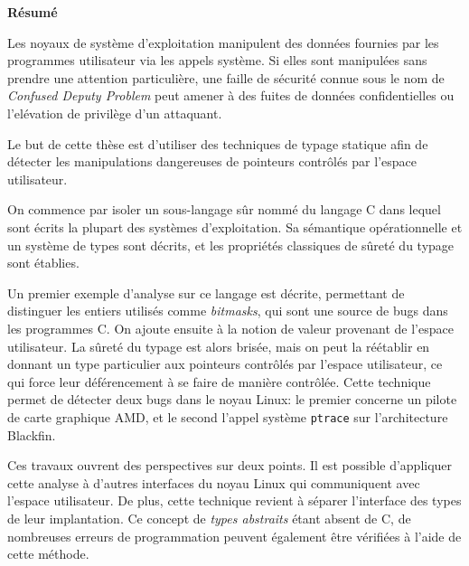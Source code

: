 \cleartoverso{}

\begin{headingpage}
\thispagestyle{empty}

\begin{center}\Large \textbf{Résumé}\end{center}

Les noyaux de système d'exploitation manipulent des données fournies par les
programmes utilisateur via les appels système. Si elles sont manipulées sans
prendre une attention particulière, une faille de sécurité connue sous le nom de
\emph{Confused Deputy Problem} peut amener à des fuites de données
confidentielles ou l'elévation de privilège d'un attaquant.

Le but de cette thèse est d'utiliser des techniques de typage statique afin de
détecter les manipulations dangereuses de pointeurs contrôlés par l'espace
utilisateur.

On commence par isoler un sous-langage sûr nommé \langname{} du langage C dans
lequel sont écrits la plupart des systèmes d'exploitation. Sa sémantique
opérationnelle et un système de types sont décrits, et les propriétés classiques
de sûreté du typage sont établies.

Un premier exemple d'analyse sur ce langage est décrite, permettant de
distinguer les entiers utilisés comme \emph{bitmasks}, qui sont une source de
bugs dans les programmes C. On ajoute ensuite à \langname{} la notion de valeur
provenant de l'espace utilisateur. La sûreté du typage est alors brisée, mais on
peut la réétablir en donnant un type particulier aux pointeurs contrôlés par
l'espace utilisateur, ce qui force leur déférencement à se faire de manière
contrôlée. Cette technique permet de détecter deux bugs dans le noyau Linux: le
premier concerne un pilote de carte graphique AMD, et le second l'appel système
\texttt{ptrace} sur l'architecture Blackfin.

Ces travaux ouvrent des perspectives sur deux points. Il est possible
d'appliquer cette analyse à d'autres interfaces du noyau Linux qui communiquent
avec l'espace utilisateur. De plus, cette technique revient à séparer
l'interface des types de leur implantation. Ce concept de \emph{types abstraits}
étant absent de C, de nombreuses erreurs de programmation peuvent également être
vérifiées à l'aide de cette méthode.



\end{headingpage}
